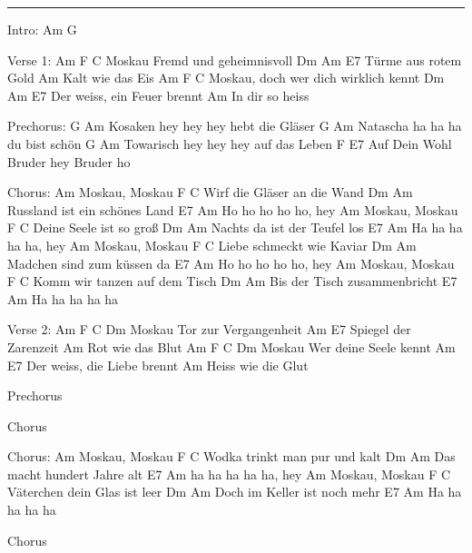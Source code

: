 \noindent\rule{\columnwidth}{1pt}
\begin{multicols}{2}
\begin{lstsong}
Intro: Am G

Verse 1:
Am      F              C
Moskau     Fremd und geheimnisvoll
Dm             Am          E7
    Türme aus rotem Gold
             Am
Kalt wie das Eis
Am      F                C
Moskau,    doch wer dich wirklich kennt
Dm                   Am            E7
     Der weiss, ein Feuer brennt
          Am
In dir so heiss

Prechorus:
        G                    Am
Kosaken hey hey hey hebt die Gläser
         G                Am
Natascha ha ha ha du bist schön
          G                   Am
Towarisch hey hey hey auf das Leben
                       F        E7
Auf Dein Wohl Bruder hey Bruder ho

Chorus:
Am
Moskau, Moskau
F               C
Wirf die Gläser an die Wand
Dm               Am
Russland ist ein schönes Land
E7         Am
Ho ho ho ho ho, hey
Am
Moskau, Moskau
F           C
Deine Seele ist so groß
Dm                Am
Nachts da ist der Teufel los
E7         Am
Ha ha ha ha ha, hey
Am
Moskau, Moskau
F                  C
Liebe schmeckt wie Kaviar
Dm               Am
Madchen sind zum küssen da
E7         Am
Ho ho ho ho ho, hey
Am
Moskau, Moskau
F                 C
Komm wir tanzen auf dem Tisch
Dm              Am
Bis der Tisch zusammenbricht
E7         Am
Ha ha ha ha ha

Verse 2:
Am      F             C           Dm
Moskau     Tor zur Vergangenheit
          Am          E7
Spiegel der Zarenzeit
             Am
Rot wie das Blut
Am      F            C           Dm
Moskau    Wer deine Seele kennt
               Am            E7
Der weiss, die Liebe brennt
              Am
Heiss wie die Glut

Prechorus

Chorus

Chorus:
Am
Moskau, Moskau
F                 C            
Wodka trinkt man pur und kalt
Dm                 Am          
Das macht hundert Jahre alt
E7          Am
ha ha ha ha ha, hey
Am
Moskau, Moskau
F              C
Väterchen dein Glas ist leer
Dm             Am
Doch im Keller ist noch mehr
E7          Am
Ha ha ha ha ha

Chorus
\end{lstsong}
\end{multicols}
\newpage
